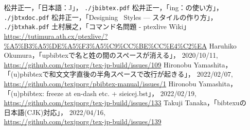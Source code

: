 \documentclass[a4paper,11pt,nomag,dvipdfmx]{jsarticle}
\def\file#1{\texttt{#1}}
\def\JBibTeX{\leavevmode\textcompwordmark\lower.5ex\hbox{J}\kern-.08em\BibTeX}
\def\JBibTeX{J\BibTeX}%
\begin{document}
\clearpage
\begin{thebibliography}{99}
  松井正一，「日本語\BibTeX ：\JBibTeX」，
  \file{./jbibtex.pdf}
  松井正一，「\BibTeX ing：\BibTeX の使い方」，
  \file{./jbtxdoc.pdf}
  松井正一，「Designing \BibTeX\ Styles --- \BibTeX スタイルの作り方」，
  \file{./jbtxhak.pdf}
  土村展之，「コマンド名問題 - ptexlive Wiki」\\
  \url{https://tutimura.ath.cx/ptexlive/?%A5%B3%A5%DE%A5%F3%A5%C9%CC%BE%CC%E4%C2%EA}
  Haruhiko Okumura，「upbibtexで名と姓の間のスペースが消える」，
  2020/10/11,\\
  \url{https://github.com/texjporg/tex-jp-build/issues/109}
  Hironobu Yamashita，「(u)pbibtexで和文文字直後の半角スペースで改行が起きる」，
  2022/02/07,\\
  \url{https://github.com/texjporg/pbibtex-manual/issues/1}
  Hironobu Yamashita，「(u)pbibtex: freeze at en-dash etc. + sieicej.bst」，
  2022/02/19,\\
  \url{https://github.com/texjporg/tex-jp-build/issues/133}
  Takuji Tanaka，「bibtexuの日本語(CJK)対応」，
  2022/04/16,\\
  \url{https://github.com/texjporg/tex-jp-build/issues/139}
\end{thebibliography}
\end{document}
